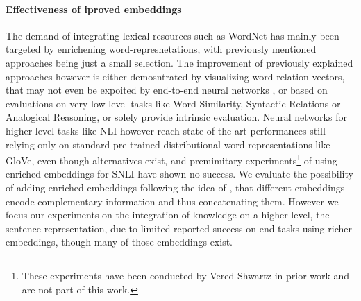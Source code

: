 \paragraph*{Effectiveness of iproved embeddings}
The demand of integrating lexical resources such as WordNet has mainly been targeted by enrichening word-represnetations, with previously mentioned approaches being just a small selection. The improvement of previously explained approaches however is either demosntrated by visualizing word-relation vectors, that may not even be expoited by end-to-end neural networks \citep{levy2015improving}, or based on evaluations on very low-level tasks like Word-Similarity, Syntactic Relations or Analogical Reasoning, or solely provide intrinsic evaluation. Neural networks for higher level tasks like \ac{NLI} however reach state-of-the-art performances still relying only on standard pre-trained distributional word-representations like GloVe, even though alternatives exist, and premimitary experiments\footnote{These experiments have been conducted by Vered Shwartz in prior work and are not part of this work.} of using enriched embeddings for \ac{SNLI} have shown no success. We evaluate the possibility of adding enriched embeddings following the idea of \cite{ruckle2018concatenated}, that different embeddings encode complementary information and thus concatenating them. However we focus our experiments on the integration of knowledge on a higher level, the sentence representation, due to limited reported success on end tasks using richer embeddings, though many of those embeddings exist.

